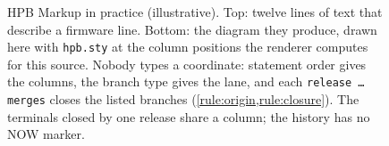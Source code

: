 \begin{figure}[tbp]
\medskip
{}
\caption{HPB Markup in practice (illustrative). Top: twelve lines of text
that describe a firmware line. Bottom: the diagram they produce, drawn here
with \texttt{hpb.sty} at the column positions the renderer computes for
this source. Nobody types a coordinate: statement order gives the columns,
the branch type gives the lane, and each \texttt{release \dots{} merges}
closes the listed branches (\cref{rule:origin,rule:closure}). The terminals
closed by one release share a column; the history has no NOW marker.}
\label{fig:markup-example}
\end{figure}

